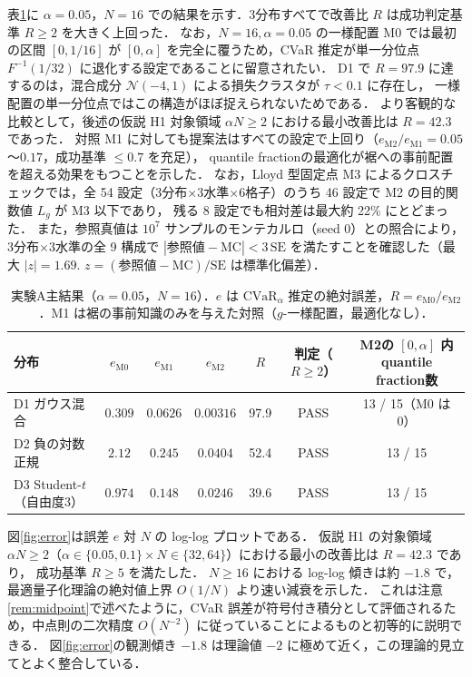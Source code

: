 \documentclass[a4paper,10pt]{jsarticle}
\theoremstyle{definition}
\newcommand{\CVaR}{\mathrm{CVaR}}
\newcommand{\Finv}{F^{-1}}
\begin{document}
表\ref{tab:A1}に $\alpha=0.05$，$N=16$ での結果を示す．3分布すべてで改善比 $R$ は成功判定基準 $R\ge2$ を大きく上回った．
なお，$N=16, \alpha=0.05$ の一様配置 M0 では最初の区間 $[0, 1/16]$ が $[0, \alpha]$ を完全に覆うため，CVaR 推定が単一分位点 $\Finv(1/32)$ に退化する設定であることに留意されたい．
D1 で $R=97.9$ に達するのは，混合成分 $\mathcal N(-4,1)$ による損失クラスタが $\tau<0.1$ に存在し，
一様配置の単一分位点ではこの構造がほぼ捉えられないためである．
より客観的な比較として，後述の仮説 H1 対象領域 $\alpha N\ge2$ における最小改善比は $R=42.3$ であった．
対照 M1 に対しても提案法はすべての設定で上回り（$e_{\mathrm{M2}}/e_{\mathrm{M1}}=0.05$〜$0.17$，成功基準 $\le0.7$ を充足），
quantile fractionの最適化が裾への事前配置を超える効果をもつことを示した．
なお，Lloyd 型固定点 M3 によるクロスチェックでは，全 54 設定（3分布$\times$3水準$\times$6格子）のうち 46 設定で M2 の目的関数値 $L_g$ が M3 以下であり，
残る 8 設定でも相対差は最大約 22\% にとどまった．
また，参照真値は $10^7$ サンプルのモンテカルロ（seed 0）との照合により，3分布$\times$3水準の全 9 構成で
$|\text{参照値}-\text{MC}|<3\,\mathrm{SE}$ を満たすことを確認した（最大 $|z|=1.69$. $z=(\text{参照値}-\text{MC})/\mathrm{SE}$ は標準化偏差）．

\begin{table}[htbp]
\centering
\caption{実験A主結果（$\alpha=0.05$，$N=16$）．$e$ は $\CVaR_\alpha$ 推定の絶対誤差，$R=e_{\mathrm{M0}}/e_{\mathrm{M2}}$．M1 は裾の事前知識のみを与えた対照（$g$-一様配置，最適化なし）．}
\label{tab:A1}
\small
\setlength{\tabcolsep}{4pt}
\begin{tabular}{lcccccc}
\toprule
分布 & $e_{\mathrm{M0}}$ & $e_{\mathrm{M1}}$ & $e_{\mathrm{M2}}$ & $R$ & 判定（$R\ge2$） & M2の $[0,\alpha]$ 内quantile fraction数\\
\midrule
D1 ガウス混合 & $0.309$ & $0.0626$ & $0.00316$ & 97.9 & PASS & 13 / 15（M0 は 0）\\
D2 負の対数正規 & $2.12$ & $0.245$ & $0.0404$ & 52.4 & PASS & 13 / 15\\
D3 Student-$t$（自由度3） & $0.974$ & $0.148$ & $0.0246$ & 39.6 & PASS & 13 / 15\\
\bottomrule
\end{tabular}
\end{table}

図\ref{fig:error}は誤差 $e$ 対 $N$ の log-log プロットである．
仮説 H1 の対象領域 $\alpha N\ge2$（$\alpha\in\{0.05,0.1\}\times N\in\{32,64\}$）における最小の改善比は $R=42.3$ であり，
成功基準 $R\ge5$ を満たした．
$N\ge16$ における log-log 傾きは約 $-1.8$ で，最適量子化理論の絶対値上界 $O(1/N)$ より速い減衰を示した．
これは注意\ref{rem:midpoint}で述べたように，CVaR 誤差が符号付き積分として評価されるため，中点則の二次精度 $O(N^{-2})$ に従っていることによるものと初等的に説明できる．
図\ref{fig:error}の観測傾き $-1.8$ は理論値 $-2$ に極めて近く，この理論的見立てとよく整合している．
\end{document}
